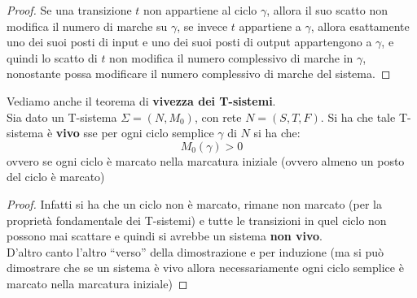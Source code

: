 \documentclass[a4paper,12pt, oneside]{book}
\begin{document}
\begin{proof}
  Se una transizione $t$ non appartiene al ciclo $\gamma$, allora il suo scatto
  non modifica il numero di marche su $\gamma$, se invece $t$ appartiene a
  $\gamma$, allora esattamente uno dei suoi posti di input e uno dei suoi posti
  di output appartengono a $\gamma$, e quindi lo scatto di $t$ non modifica il
  numero complessivo di marche in $\gamma$, nonostante possa modificare il
  numero complessivo di marche del sistema. 
\end{proof}
\newpage
\begin{teorema}
  Vediamo anche il teorema di \textbf{vivezza dei T-sistemi}.\\
   Sia dato un T-sistema $\Sigma = (N,M_0)$, con rete $N=(S,T,F)$. Si ha che
   tale T-sistema è \textbf{vivo} sse per ogni ciclo semplice $\gamma$ di $N$ si
   ha che:
   \[M_0(\gamma)>0\]
   ovvero se ogni ciclo è marcato nella marcatura iniziale (ovvero almeno un
   posto del ciclo è marcato)
\end{teorema}
\begin{proof}
  Infatti si ha che un ciclo non è marcato, rimane non marcato (per la
  proprietà fondamentale dei T-sistemi) e tutte le transizioni in quel ciclo non
  possono mai scattare e quindi si avrebbe un sistema \textbf{non vivo}. \\
  D'altro canto l'altro ``verso'' della dimostrazione e per induzione (ma si può
  dimostrare che se un sistema è vivo allora necessariamente ogni ciclo semplice
  è marcato nella marcatura iniziale) 
\end{proof}
\end{document}
